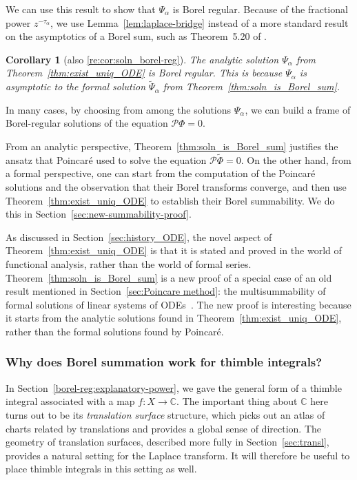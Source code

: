 \documentclass{article}
\newcommand{\maps}{\colon}
\newcommand{\C}{\mathbb{C}}
\newcommand{\series}[1]{\tilde{#1}}
\theoremstyle{definition}
\theoremstyle{plain}
\newtheorem{corollary}[theorem]{Corollary}
\begin{document}
We can use this result to show that $\Psi_\alpha$ is Borel regular. Because of the fractional power $z^{-\tau_\alpha}$, we use Lemma~\ref{lem:laplace-bridge} instead of a more standard result on the asymptotics of a Borel sum, such as Theorem~5.20 of \cite{diverg-resurg-i}.
\begin{corollary}[also \ref{re:cor:soln_borel-reg}]\label{cor:soln_borel-reg}
The analytic solution $\Psi_\alpha$ from Theorem~\ref{thm:exist_uniq_ODE} is Borel regular. This is because $\Psi_\alpha$ is asymptotic to the formal solution $\series{\Psi}_\alpha$ from Theorem~\ref{thm:soln_is_Borel_sum}.
\end{corollary}
In many cases, by choosing from among the solutions $\Psi_\alpha$, we can build a frame of Borel-regular solutions of the equation $\mathcal{P}\Phi = 0$.

From an analytic perspective, Theorem~\ref{thm:soln_is_Borel_sum} justifies the ansatz that Poincar\'{e} used to solve the equation $\mathcal{P}\series{\Phi} = 0$. On the other hand, from a formal perspective, one can start from the computation of the Poincar\'{e} solutions and the observation that their Borel transforms converge, and then use Theorem~\ref{thm:exist_uniq_ODE} to establish their Borel summability. We do this in Section~\ref{sec:new-summability-proof}.

As discussed in Section~\ref{sec:history_ODE}, the novel aspect of Theorem~\ref{thm:exist_uniq_ODE} is that it is stated and proved in the world of functional analysis, rather than the world of formal series. Theorem~\ref{thm:soln_is_Borel_sum} is a new proof of a special case of an old result mentioned in Section~\ref{sec:Poincare method}: the multisummability of formal solutions of linear systems of ODEs~\cite{ramis1991series,braaksma2006laplace}. The new proof is interesting because it starts from the analytic solutions found in Theorem~\ref{thm:exist_uniq_ODE}, rather than the formal solutions found by Poincar\'{e}.
\subsubsection{Why does Borel summation work for thimble integrals?}\label{sec:why_borel_thimble}
In Section~\ref{borel-reg:explanatory-power}, we gave the general form of a thimble integral associated with a map $f \maps X \to \C$. The important thing about $\C$ here turns out to be its {\em translation surface} structure, which picks out an atlas of charts related by translations and provides a global sense of direction. The geometry of translation surfaces, described more fully in Section~\ref{sec:transl}, provides a natural setting for the Laplace transform. It will therefore be useful to place thimble integrals in this setting as well.
\end{document}

